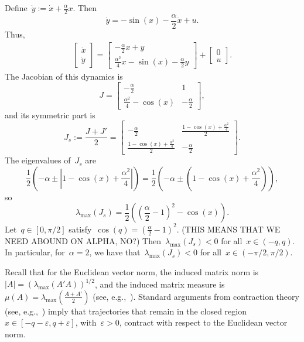 \documentclass[10pt,onecolumn,twoside,letter]{IEEEtran}
\theoremstyle{plain}
\begin{document}
Define~$\dot{y}:=\dot x+\frac{\alpha}{2}x$. Then
\[
            \dot y =-\sin(x)-\frac{\alpha}{2}\dot x +u.
\]
  Thus,
\begin{align*}
                \begin{bmatrix} \dot x \\ \dot y \end{bmatrix} = \begin{bmatrix} -\frac{\alpha}{2}x+y \\  \frac{\alpha^2}{4}x-\sin(x)-\frac{\alpha}{2} y \end{bmatrix}
                +\begin{bmatrix} 0 \\u \end{bmatrix}.
\end{align*}
The Jacobian of this dynamics is
\[
            J=\begin{bmatrix}   -\frac{\alpha}{ 2} & 1 \\\frac{\alpha^2}{4}-\cos(x) &-\frac{\alpha}{2}       
               \end{bmatrix},
\]
and its symmetric part is 
\[
            J_s:=\frac{J+J'}{2}= \begin{bmatrix}   -\frac{\alpha}{ 2} & \frac{  1-\cos(x)+\frac{\alpha^2}{4}}{2}\\
           \frac{  1-\cos(x)+\frac{\alpha^2}{4}}{2} &-\frac{\alpha}{2}
               \end{bmatrix}.
\]
The eigenvalues of~$J_s$ are
\[
             \frac{1}{2} \left(  -  {\alpha}  \pm   |  1-\cos(x)+\frac{\alpha^2}{4}  | \right)=\frac{1}{2} \left(  -  {\alpha}  \pm    (  1-\cos(x)+\frac{\alpha^2}{4} )   \right),
\]
so
\[
            \lambda_{\max}(J_s)=\frac{1}{2} \left(   (\frac{\alpha}{2}-1)^2 -\cos(x)     \right).
\]
Let~$q \in[0,\pi/2]$ satisfy~$\cos(q)=(\frac{\alpha}{2}-1)^2$.
(THIS MEANS THAT WE NEED ABOUND ON ALPHA, NO?)
Then~$ \lambda_{\max}(J_s)<0$ for all~$x\in(-q,q)$.
In particular, for~$\alpha=2$, we have that~$ \lambda_{\max}(J_s)<0$ for all~$x\in(-\pi/2,\pi/2)$.

 
Recall that for the Euclidean vector norm, the induced
matrix norm is~$|A|=(\lambda_{\max}(A'A))^{1/2} $,
 and the induced matrix measure is~$\mu(A)=\lambda_{\max}( \frac{A+A'}{2} )$ (see, e.g.,~\cite{vid}).
Standard arguments from contraction theory (see, e.g.,~\cite{LOHMILLER1998683,sontag_contraction_tutorial}) imply
that   trajectories that remain in the closed  region~$x \in [-q-\varepsilon,q+\varepsilon]$, with~$\varepsilon>0$,
contract with respect to the Euclidean  vector  norm. 





\end{document}
